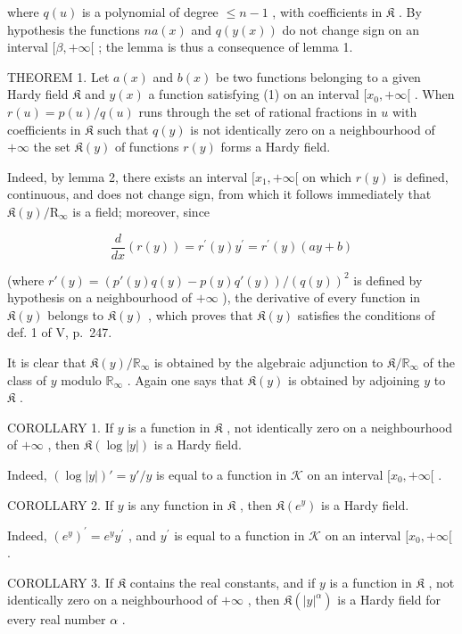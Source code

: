 where \(q(u)\) is a polynomial of degree \(\leqslant n - 1\) , with coefficients in \(\mathfrak{K}\) . By hypothesis the functions \(na(x)\) and \(q(y(x))\) do not change sign on an interval \([\beta, +\infty[\) ; the lemma is thus a consequence of lemma 1.

THEOREM 1. Let \(a(x)\) and \(b(x)\) be two functions belonging to a given Hardy field \(\mathfrak{K}\) and \(y(x)\) a function satisfying (1) on an interval \([x_0, +\infty[\) . When \(r(u) = p(u) / q(u)\) runs through the set of rational fractions in \(u\) with coefficients in \(\mathfrak{K}\) such that \(q(y)\) is not identically zero on a neighbourhood of \(+\infty\) the set \(\mathfrak{K}(y)\) of functions \(r(y)\) forms a Hardy field.

Indeed, by lemma 2, there exists an interval \([x_1, +\infty[\) on which \(r(y)\) is defined, continuous, and does not change sign, from which it follows immediately that \(\mathfrak{K}(y)/\mathrm{R}_{\infty}\) is a field; moreover, since

\[
\frac {d}{d x} (r (y)) = r ^ {\prime} (y) y ^ {\prime} = r ^ {\prime} (y) (a y + b)
\]

(where \(r'(y) = \left(p'(y)q(y) - p(y)q'(y)\right)/\left(q(y)\right)^2\) is defined by hypothesis on a neighbourhood of \(+\infty\) ), the derivative of every function in \(\mathfrak{K}(y)\) belongs to \(\mathfrak{K}(y)\) , which proves that \(\mathfrak{K}(y)\) satisfies the conditions of def. 1 of V, p.~247.

It is clear that \(\mathfrak{K}(y) / \mathbb{R}_{\infty}\) is obtained by the algebraic adjunction to \(\mathfrak{K} / \mathbb{R}_{\infty}\) of the class of \(y\) modulo \(\mathbb{R}_{\infty}\) . Again one says that \(\mathfrak{K}(y)\) is obtained by adjoining \(y\) to \(\mathfrak{K}\) .

COROLLARY 1. If \(y\) is a function in \(\mathfrak{K}\) , not identically zero on a neighbourhood of \(+\infty\) , then \(\mathfrak{K}(\log |y|)\) is a Hardy field.

Indeed, \((\log |y|)' = y'/y\) is equal to a function in \(\mathcal{K}\) on an interval \([x_0, +\infty[\) .

COROLLARY 2. If \(y\) is any function in \(\mathfrak{K}\) , then \(\mathfrak{K}(e^y)\) is a Hardy field.

Indeed, \(\left(e^{y}\right)^{\prime} = e^{y}y^{\prime}\) , and \(y^\prime\) is equal to a function in \(\mathcal{K}\) on an interval \([x_0, +\infty[\) .

COROLLARY 3. If \(\mathfrak{K}\) contains the real constants, and if \(y\) is a function in \(\mathfrak{K}\) , not identically zero on a neighbourhood of \(+\infty\) , then \(\mathfrak{K}(|y|^{\alpha})\) is a Hardy field for every real number \(\alpha\) .

